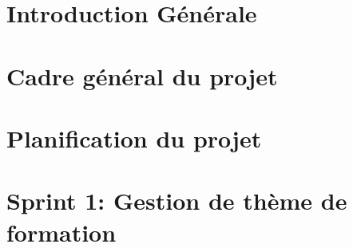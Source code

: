 \documentclass[a4paper, oneside, 12pt, final]{extreport}
\newcommand{\juryPresident} {%
  \textbf{Encadrant entreprise}: \textsc{Mr. CHOKRI BEN ROMDHANE}
}
\newcommand{\juryMemberOne} {%
  \textbf{Encadrant ISET}: \textsc{Mr. Bassem BOUGHZELA}
}
\begin{document}





\tableofcontents

\listoffigures
\listoftables
\cleardoublepage

\newpage
{}
\chapter*{Introduction Générale}
\label{chap:general_intorduction}



\chapter{Cadre général du projet }%
\label{chap:chapterone}


%


\chapter{Planification du projet}%
\label{chap:2}

\chapter{Sprint 1: Gestion de thème de formation}%
\label{chap:3}

\end{document}
